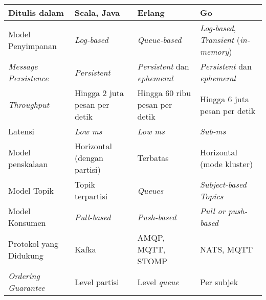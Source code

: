 \begin{longtable}{|p{}|p{}|p{}|p{}|}
    \hline
    Ditulis dalam                & Scala, Java                                                          & Erlang                                        & Go                                                                   \\
    \hline
    Model Penyimpanan            & \textit{Log-based}                                                   & \textit{Queue-based}                          & \textit{Log-based}, \textit{Transient} (\textit{in-memory})          \\
    \hline
    \textit{Message Persistence} & \textit{Persistent}                                                  & \textit{Persistent} dan \textit{ephemeral}    & \textit{Persistent} dan \textit{ephemeral}                           \\
    \hline
    \textit{Throughput}          & Hingga 2 juta pesan per detik                                        & Hingga 60 ribu pesan per detik                & Hingga 6 juta pesan per detik                                        \\
    \hline
    Latensi                      & \textit{Low ms}                                                      & \textit{Low ms}                               & \textit{Sub-ms}                                                      \\
    \hline
    Model penskalaan             & Horizontal (dengan partisi)                                          & Terbatas                                      & Horizontal (mode kluster)                                            \\
    \hline
    Model Topik                  & Topik terpartisi                                                     & \textit{Queues}                               & \textit{Subject-based Topics}                                        \\
    \hline
    Model Konsumen               & \textit{Pull-based}                                                  & \textit{Push-based}                           & \textit{Pull or push-based}                                          \\
    \hline
    Protokol yang Didukung       & Kafka                                                                & AMQP, MQTT, STOMP                             & NATS, MQTT                                                           \\
    \hline
    \textit{Ordering Guarantee}  & Level partisi                                                        & Level \textit{queue}                          & Per subjek                                                           \\

\end{longtable}
